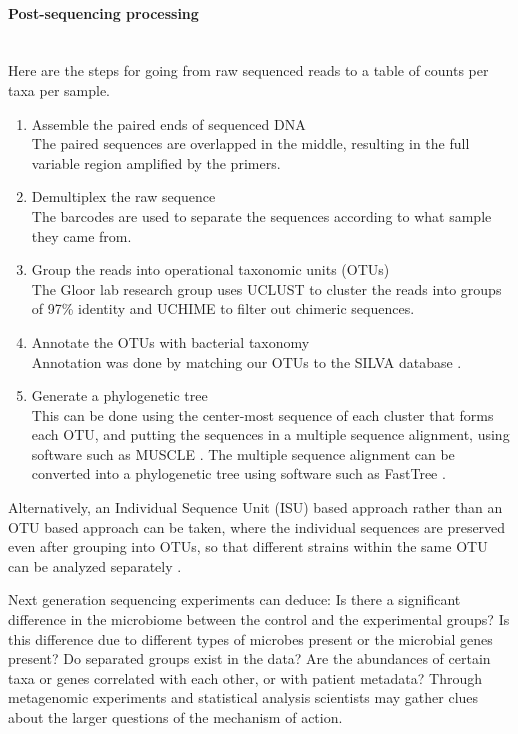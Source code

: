 \paragraph{Post-sequencing processing}\mbox{}\\
Here are the steps for going from raw sequenced reads to a table of counts per taxa per sample.
\begin{enumerate}
\item Assemble the paired ends of sequenced DNA\\
The paired sequences are overlapped in the middle, resulting in the full variable region amplified by the primers.

\item Demultiplex the raw sequence\\
The barcodes are used to separate the sequences according to what sample they came from.

\item Group the reads into operational taxonomic units (OTUs)\\
The Gloor lab research group uses UCLUST \cite{edgar2010search} to cluster the reads into groups of 97\% identity and UCHIME \cite{edgar2011uchime} to filter out chimeric sequences.

\item Annotate the OTUs with bacterial taxonomy\\
Annotation was done by  matching our OTUs to the SILVA database \cite{quast2013silva}.

\item Generate a phylogenetic tree\\
This can be done using the center-most sequence of each cluster that forms each OTU, and putting the sequences in a multiple sequence alignment, using software such as MUSCLE \cite{edgar2004muscle}. The multiple sequence alignment can be converted into a phylogenetic tree using software such as FastTree \cite{price2010fasttree}.
\end{enumerate}

Alternatively, an Individual Sequence Unit (ISU) based approach rather than an OTU based approach can be taken, where the individual sequences are preserved even after grouping into OTUs, so that different strains within the same OTU can be analyzed separately \cite{callahan2015dada2}.

Next generation sequencing experiments can deduce: Is there a significant difference in the microbiome between the control and the experimental groups? Is this difference due to different types of microbes present or the microbial genes present? Do separated groups exist in the data? Are the abundances of certain taxa or genes correlated with each other, or with patient metadata? Through metagenomic experiments and statistical analysis scientists may gather clues about the larger questions of the mechanism of action.

